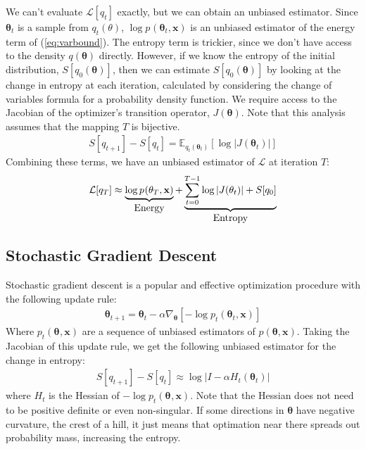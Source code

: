 \documentclass[]{article}
\newcommand{\vx}{\mathbf{x}}
\newcommand{\expectargs}[2]{\mathbb{E}_{#1} \left[ {#2} \right]}
\newcommand{\varL}{\mathcal{L}}
\newcommand{\data}{\vx}
\newcommand{\params}{\mathbf{\theta}}
\newcommand{\stepsize}{\alpha}
\newcommand{\jointdist}{p(\params , \data)}
\newcommand{\subjointdist}[2]{p_{#1}(\params_{#2} , \data)}
\begin{document}
We can't evaluate $\varL[q_t]$ exactly, but we can obtain an unbiased estimator.
Since $\params_t$ is a sample from $q_t(\theta)$, $\log \subjointdist{}{t}$ is
an unbiased estimator of the energy term of (\ref{eq:varbound}). The entropy term
is trickier, since we don't have access to the density $q(\params)$
directly. However, if we know the entropy of the initial distribution,
$S[q_0(\params)]$, then we can estimate $S[q_0(\params)]$ by
looking at the change in entropy at each iteration, calculated by considering
the change of variables formula for a probability density function.
We require access to the Jacobian of the optimizer's transition operator,
$J(\params)$. Note that this analysis assumes that the mapping $T$ is bijective.
%
\begin{align}
S[q_{t+1}] - S[q_t] =
  \expectargs{q_t(\params_t)}{\log
    \left| J(\params_t) \right|}
  \nonumber
\end{align}
%
Combining these terms, we have an unbiased estimator of $\varL$ at iteration $T$:
\begin{align}
\varL[q_T] \approx
  \underbrace{\log \subjointdist{}{T}}_{\textnormal{\normalsize Energy}} +
  \underbrace{\sum_{t=0}^{T-1} \log \left| J(\params_t) \right| + S[q_0]}_{\textnormal{\normalsize Entropy}}
  \nonumber
\end{align}



\subsection{Stochastic Gradient Descent}

Stochastic gradient descent is a popular and effective optimization
procedure with the following update rule:
\begin{align}
\params_{t+1} =
  \params_t - \stepsize \nabla_{\params}
  \left[-\log \subjointdist{t}{t} \right] \nonumber
\end{align}
Where $\subjointdist{t}{}$ are a sequence of unbiased estimators of
$\jointdist$. Taking the Jacobian of this update rule, we get the following
unbiased estimator for the change in entropy:
\begin{align}
S[q_{t+1}] - S[q_t] \approx \log \left| I - \stepsize H_t(\params_t)
\right| \label{eq:exact hessian}
\end{align}
where $H_t$ is the Hessian of $-\log\subjointdist{t}{}$. Note that the Hessian does not
need to be positive definite or even non-singular. If some directions in
$\params$ have negative curvature, the crest of a hill, it just means that
optimation near there spreads out probability mass, increasing the entropy.
\end{document}
